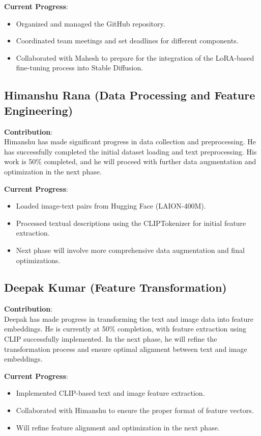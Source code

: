 \documentclass{exam}
\begin{document}
\textbf{Current Progress}: 
\begin{itemize}
    \item Organized and managed the GitHub repository.
    \item Coordinated team meetings and set deadlines for different components.
    \item Collaborated with Mahesh to prepare for the integration of the LoRA-based fine-tuning process into Stable Diffusion.
\end{itemize}

\vspace{0.2in}

\subsection{Himanshu Rana (Data Processing and Feature Engineering)}
\textbf{Contribution}: \\
Himanshu has made significant progress in data collection and preprocessing. He has successfully completed the initial dataset loading and text preprocessing. His work is 50\% completed, and he will proceed with further data augmentation and optimization in the next phase.

\textbf{Current Progress}: 
\begin{itemize}
    \item Loaded image-text pairs from Hugging Face (LAION-400M).
    \item Processed textual descriptions using the CLIPTokenizer for initial feature extraction.
    \item Next phase will involve more comprehensive data augmentation and final optimizations.
\end{itemize}

\vspace{0.2in}

\subsection{Deepak Kumar (Feature Transformation)}
\textbf{Contribution}: \\
Deepak has made progress in transforming the text and image data into feature embeddings. He is currently at 50\% completion, with feature extraction using CLIP successfully implemented. In the next phase, he will refine the transformation process and ensure optimal alignment between text and image embeddings.

\textbf{Current Progress}: 
\begin{itemize}
    \item Implemented CLIP-based text and image feature extraction.
    \item Collaborated with Himanshu to ensure the proper format of feature vectors.
    \item Will refine feature alignment and optimization in the next phase.
\end{itemize}
\end{document}
